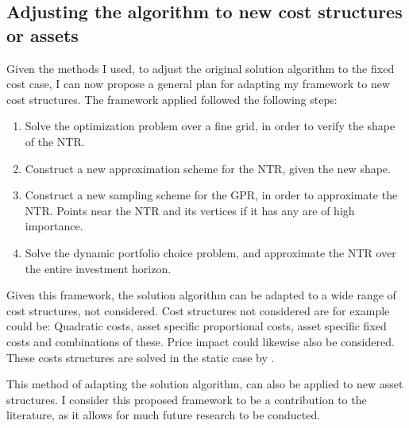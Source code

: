 \documentclass[11pt]{article}
\begin{document}
\subsection{Adjusting the algorithm to new cost structures or assets} \label{Subsection: AdjustingAlgorithm}
Given the methods I used, to adjust the original solution algorithm to the fixed cost case, I can now propose a general plan for adapting
my framework to new cost structures.
The framework applied followed the following steps:
\begin{enumerate}
    \item Solve the optimization problem over a fine grid, in order to verify the shape of the NTR.
    \item Construct a new approximation scheme for the NTR, given the new shape.
    \item Construct a new sampling scheme for the GPR, in order to approximate the NTR. Points near the NTR and its vertices if it has any are of high importance.
    \item Solve the dynamic portfolio choice problem, and approximate the NTR over the entire investment horizon.
\end{enumerate}
Given this framework, the solution algorithm can be adapted to a wide range of cost structures, not considered.
Cost structures not considered are for example could be: Quadratic costs, asset specific proportional costs,
asset specific fixed costs and combinations of these. Price impact could likewise also be considered.
These costs structures are solved in the static case by \autocite{Dybvig2020}.

This method of adapting the solution algorithm, can also be applied to new asset structures.
I consider this proposed framework to be a contribution to the literature, as it allows for much future research to be conducted. 
\end{document}
